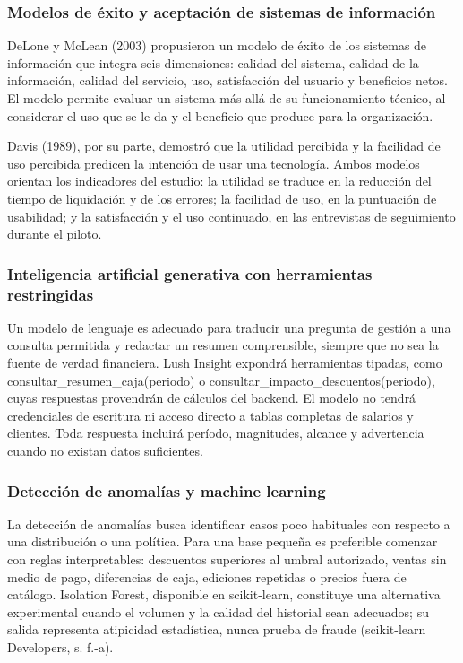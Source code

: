 \subsubsection{Modelos de éxito y aceptación de sistemas de información}

DeLone y McLean (2003) propusieron un modelo de éxito de los sistemas de información que integra seis dimensiones: calidad del sistema, calidad de la información, calidad del servicio, uso, satisfacción del usuario y beneficios netos. El modelo permite evaluar un sistema más allá de su funcionamiento técnico, al considerar el uso que se le da y el beneficio que produce para la organización.


Davis (1989), por su parte, demostró que la utilidad percibida y la facilidad de uso percibida predicen la intención de usar una tecnología. Ambos modelos orientan los indicadores del estudio: la utilidad se traduce en la reducción del tiempo de liquidación y de los errores; la facilidad de uso, en la puntuación de usabilidad; y la satisfacción y el uso continuado, en las entrevistas de seguimiento durante el piloto.


\subsubsection{Inteligencia artificial generativa con herramientas restringidas}

Un modelo de lenguaje es adecuado para traducir una pregunta de gestión a una consulta permitida y redactar un resumen comprensible, siempre que no sea la fuente de verdad financiera. Lush Insight expondrá herramientas tipadas, como consultar\_resumen\_caja(periodo) o consultar\_impacto\_descuentos(periodo), cuyas respuestas provendrán de cálculos del backend. El modelo no tendrá credenciales de escritura ni acceso directo a tablas completas de salarios y clientes. Toda respuesta incluirá período, magnitudes, alcance y advertencia cuando no existan datos suficientes.

\subsubsection{Detección de anomalías y machine learning}

La detección de anomalías busca identificar casos poco habituales con respecto a una distribución o una política. Para una base pequeña es preferible comenzar con reglas interpretables: descuentos superiores al umbral autorizado, ventas sin medio de pago, diferencias de caja, ediciones repetidas o precios fuera de catálogo. Isolation Forest, disponible en scikit-learn, constituye una alternativa experimental cuando el volumen y la calidad del historial sean adecuados; su salida representa atipicidad estadística, nunca prueba de fraude (scikit-learn Developers, s. f.-a).

